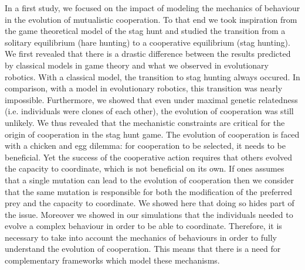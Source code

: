 		In a first study, we focused on the impact of modeling the mechanics of behaviour in the evolution of mutualistic cooperation. To that end we took inspiration from the game theoretical model of the stag hunt and studied the transition from a solitary equilibrium (hare hunting) to a cooperative equilibrium (stag hunting). We first revealed that there is a drastic difference between the results predicted by classical models in game theory and what we observed in evolutionary robotics. With a classical model, the transition to stag hunting always occured. In comparison, with a model in evolutionary robotics, this transition was nearly impossible. Furthermore, we showed that even under maximal genetic relatedness (i.e. individuals were clones of each other), the evolution of cooperation was still unlikely. We thus revealed that the mechanistic constraints are critical for the origin of cooperation in the stag hunt game. The evolution of cooperation is faced with a chicken and egg dilemma: for cooperation to be selected, it needs to be beneficial. Yet the success of the cooperative action requires that others evolved the capacity to coordinate, which is not beneficial on its own. If ones assumes that a single mutation can lead to the evolution of cooperation then we consider that the same mutation is responsible for both the modification of the preferred prey and the capacity to coordinate. We showed here that doing so hides part of the issue. Moreover we showed in our simulations that the individuals needed to evolve a complex behaviour in order to be able to coordinate. Therefore, it is necessary to take into account the mechanics of behaviours in order to fully understand the evolution of cooperation. This means that there is a need for complementary frameworks which model these mechanisms.

